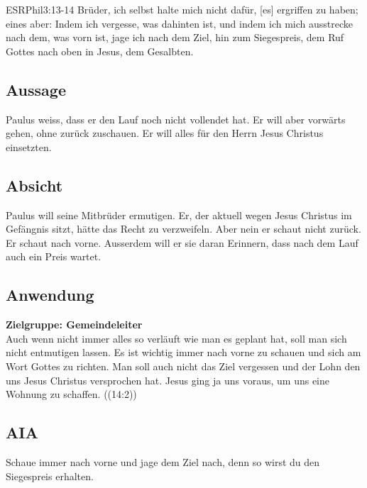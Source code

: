 \documentclass[12pt]{../../inc/mybib}
\begin{document}
\begin{bibelbox}{ESR}{Phil}{3:13-14}
    Brüder, ich selbst halte mich nicht dafür, [es] ergriffen zu haben; eines aber: Indem ich vergesse, was dahinten ist, und indem ich mich ausstrecke nach dem, was vorn ist,
    jage ich nach dem Ziel, hin zum Siegespreis, dem Ruf Gottes nach oben in Jesus, dem Gesalbten.
\end{bibelbox}
\subsection*{Aussage}
    Paulus weiss, dass er den Lauf noch nicht vollendet hat. Er will aber vorwärts gehen, ohne zurück zuschauen. Er will alles für den Herrn Jesus Christus einsetzten. 
\subsection*{Absicht}
    Paulus will seine Mitbrüder ermutigen. Er, der aktuell wegen Jesus Christus im Gefängnis sitzt, hätte das Recht zu verzweifeln. Aber nein er schaut nicht zurück. Er schaut nach vorne. Ausserdem will er sie daran Erinnern, dass nach dem Lauf auch ein Preis wartet. 
\subsection*{Anwendung}
    \textbf{Zielgruppe: Gemeindeleiter}\\
    Auch wenn nicht immer alles so verläuft wie man es geplant hat, soll man sich nicht entmutigen lassen. Es ist wichtig immer nach vorne zu schauen und sich am Wort Gottes zu richten. Man soll auch nicht das Ziel vergessen und der Lohn den uns Jesus Christus versprochen hat. Jesus ging ja uns voraus, um uns eine Wohnung zu schaffen. ((14:2))
\subsection*{AIA}
    Schaue immer nach vorne und jage dem Ziel nach, denn so wirst du den Siegespreis erhalten.
\end{document}
